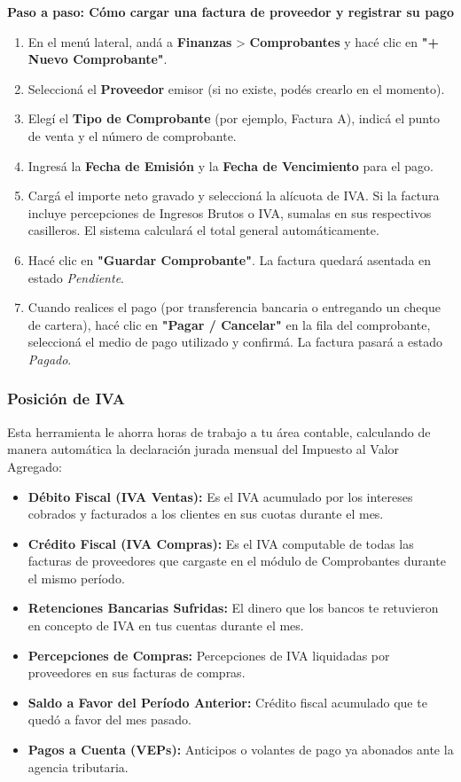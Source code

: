 \documentclass[12pt,a4paper]{article}
\renewcommand{\_}{\textunderscore\allowbreak}
\begin{document}
\textbf{Paso a paso: Cómo cargar una factura de proveedor y registrar su pago}
\begin{enumerate}
    \item En el menú lateral, andá a \textbf{Finanzas} > \textbf{Comprobantes} y hacé clic en \textbf{"+ Nuevo Comprobante"}.
    \item Seleccioná el \textbf{Proveedor} emisor (si no existe, podés crearlo en el momento).
    \item Elegí el \textbf{Tipo de Comprobante} (por ejemplo, Factura A), indicá el punto de venta y el número de comprobante.
    \item Ingresá la \textbf{Fecha de Emisión} y la \textbf{Fecha de Vencimiento} para el pago.
    \item Cargá el importe neto gravado y seleccioná la alícuota de IVA. Si la factura incluye percepciones de Ingresos Brutos o IVA, sumalas en sus respectivos casilleros. El sistema calculará el total general automáticamente.
    \item Hacé clic en \textbf{"Guardar Comprobante"}. La factura quedará asentada en estado \textit{Pendiente}.
    \item Cuando realices el pago (por transferencia bancaria o entregando un cheque de cartera), hacé clic en \textbf{"Pagar / Cancelar"} en la fila del comprobante, seleccioná el medio de pago utilizado y confirmá. La factura pasará a estado \textit{Pagado}.
\end{enumerate}

\subsubsection{Posición de IVA}
Esta herramienta le ahorra horas de trabajo a tu área contable, calculando de manera automática la declaración jurada mensual del Impuesto al Valor Agregado:

\begin{itemize}
    \item \textbf{Débito Fiscal (IVA Ventas):} Es el IVA acumulado por los intereses cobrados y facturados a los clientes en sus cuotas durante el mes.
    \item \textbf{Crédito Fiscal (IVA Compras):} Es el IVA computable de todas las facturas de proveedores que cargaste en el módulo de Comprobantes durante el mismo período.
    \item \textbf{Retenciones Bancarias Sufridas:} El dinero que los bancos te retuvieron en concepto de IVA en tus cuentas durante el mes.
    \item \textbf{Percepciones de Compras:} Percepciones de IVA liquidadas por proveedores en sus facturas de compras.
    \item \textbf{Saldo a Favor del Período Anterior:} Crédito fiscal acumulado que te quedó a favor del mes pasado.
    \item \textbf{Pagos a Cuenta (VEPs):} Anticipos o volantes de pago ya abonados ante la agencia tributaria.
\end{itemize}
\end{document}
